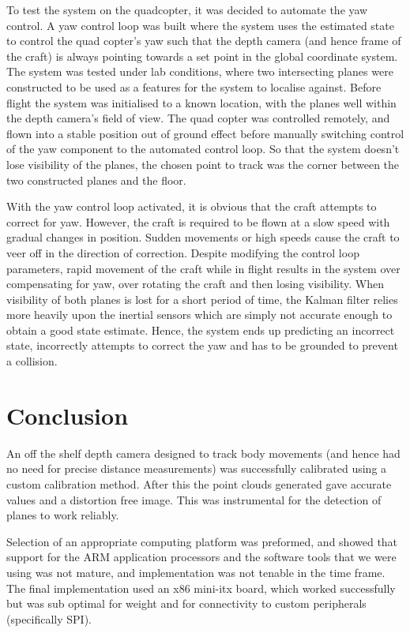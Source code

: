 \documentclass[]{article}
\begin{document}
{To test the system on the quadcopter, it was decided to automate the yaw control. A yaw control loop was built where the system uses the estimated state to control the quad copter's yaw such that the depth camera (and hence frame of the craft) is always pointing towards a set point in the global coordinate system. The system was tested under lab conditions, where two intersecting planes were constructed to be used as a features for the system to localise against. Before flight the system was initialised to a known location, with the planes well within the depth camera's field of view. The quad copter was controlled remotely, and flown into a stable position out of ground effect before manually switching control of the yaw component to the automated control loop. So that the system doesn't lose visibility of the planes, the chosen point to track was the corner between the two constructed planes and the floor. 

With the yaw control loop activated, it is obvious that the craft attempts to correct for yaw. However, the craft is required to be flown at a slow speed with gradual changes in position. Sudden movements or high speeds cause the craft to veer off in the direction of correction. Despite modifying the control loop parameters, rapid movement of the craft while in flight results in the system over compensating for yaw, over rotating the craft and then losing visibility. When visibility of both planes is lost for a short period of time, the Kalman filter relies more heavily upon the inertial sensors which are simply not accurate enough to obtain a good state estimate. Hence, the system ends up predicting an incorrect state, incorrectly attempts to correct the yaw and has to be grounded to prevent a collision. 


\section{Conclusion}
An off the shelf depth camera designed to track body movements (and hence had no need for precise distance measurements) was successfully calibrated using a custom calibration method. After this the point clouds generated gave accurate values and a distortion free image. This was instrumental for the detection of planes to work reliably. 

Selection of an appropriate computing platform was preformed, and showed that support for the ARM application processors and the software tools that we were using was not mature, and implementation was not tenable in the time frame. The final implementation used an x86 mini-itx board, which worked successfully but was sub optimal for weight and for connectivity to custom peripherals (specifically SPI).

}
\end{document}
